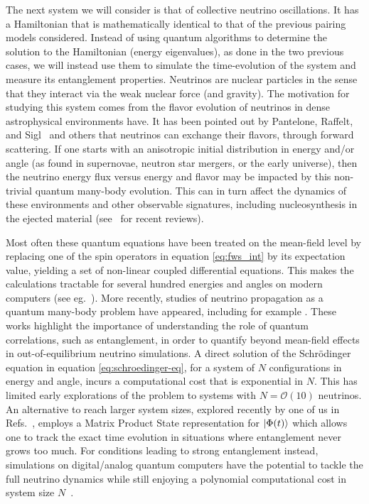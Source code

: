 \documentclass[Dual]{msu-thesis}
\begin{document}
The next system we will consider is that of collective neutrino oscillations. It has a Hamiltonian that is mathematically identical to that of the previous pairing models considered. Instead of using quantum algorithms to determine the solution to the Hamiltonian (energy eigenvalues), as done in the two previous cases, we will instead use them to simulate the time-evolution of the system and measure its entanglement properties. Neutrinos are nuclear particles in the sense that they interact via the weak nuclear force (and gravity). The motivation for studying this system comes from the flavor evolution of neutrinos in dense astrophysical environments have. It has been pointed out by Pantelone, Raffelt, and Sigl~\cite{Pantaleone:1992eq,Sigl:1993} and others that neutrinos can exchange their flavors, through forward scattering. If one starts with an anisotropic initial distribution in energy and/or angle (as found in supernovae, neutron star mergers, or the early universe), then the neutrino energy flux versus energy and flavor may be impacted by this non-trivial quantum many-body evolution. This can in turn affect the dynamics of these environments and other observable signatures, including nucleosynthesis in the ejected material (see~\cite{Duan:2010bg,Chakraborty2016b} for recent reviews).

Most often these quantum equations have been treated on the mean-field level by replacing one of the spin operators in equation \eqref{eq:fws_int} by its expectation value, yielding a set of non-linear coupled differential equations. This makes the calculations tractable for several hundred energies and angles on modern computers (see eg.~\cite{Duan:2006}).
More recently, studies of neutrino propagation as a quantum many-body problem have appeared,
including for example \cite{Bell2003,Friedland2003,sawyer2004classical,Pehlivan2011,Rrapaj2020,Cervia:2019,Roggero2021a,Roggero2021b}. These works highlight the importance of understanding the role of quantum correlations, such as entanglement, in order to quantify beyond mean-field effects in out-of-equilibrium neutrino simulations. A direct solution of the Schr\"{o}dinger equation in equation \eqref{eq:schroedinger-eq}, for a system of $N$ configurations in energy and angle, incurs a computational cost that is exponential in $N$. This has limited early explorations of the problem to systems with $N=\mathcal{O}(10)$ neutrinos. An alternative to reach larger system sizes, explored recently by one of us in Refs.~\cite{Roggero2021a,Roggero2021b}, employs a Matrix Product State representation for $\ket{\Phi(t)}$ which allows one to track the exact time evolution in situations where entanglement never grows too much. For conditions leading to strong entanglement instead, simulations on digital/analog quantum computers have the potential to tackle the full neutrino dynamics while still enjoying a polynomial computational cost in system size $N$~\cite{Lloyd96}.
\end{document}
